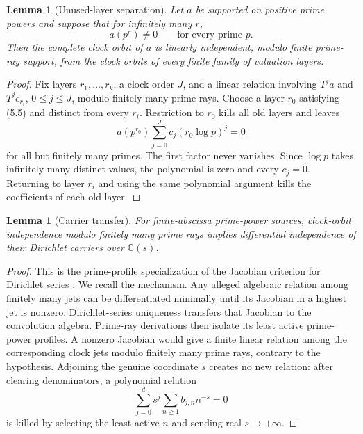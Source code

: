 \documentclass[11pt]{article}
\newtheorem{lemma}[theorem]{Lemma}
\theoremstyle{definition}
\theoremstyle{remark}
\newcommand{\C}{\mathbb C}
\begin{document}
\begin{lemma}[Unused-layer separation]\label{lem:unused}
Let \(a\) be supported on positive prime powers and suppose that for infinitely many \(r\),
\[
 a(p^r)\ne0\qquad\text{for every prime }p.           \tag{5.5}
\]
Then the complete clock orbit of \(a\) is linearly independent, modulo finite prime-ray support,
from the clock orbits of every finite family of valuation layers.
\end{lemma}

\begin{proof}
Fix layers \(r_1,\ldots,r_k\), a clock order \(J\), and a linear relation involving
\(T^ja\) and \(T^je_{r_i}\), \(0\le j\le J\), modulo finitely many prime rays.  Choose a layer
\(r_0\) satisfying (5.5) and distinct from every \(r_i\).  Restriction to \(r_0\) kills all old
layers and leaves
\[
 a(p^{r_0})\sum_{j=0}^J c_j(r_0\log p)^j=0
\]
for all but finitely many primes.  The first factor never vanishes.  Since \(\log p\) takes
infinitely many distinct values, the polynomial is zero and every \(c_j=0\).  Returning to
layer \(r_i\) and using the same polynomial argument kills the coefficients of each old layer.
\end{proof}

\begin{lemma}[Carrier transfer]\label{lem:carrier}
For finite-abscissa prime-power sources, clock-orbit independence modulo finitely many prime rays
implies differential independence of their Dirichlet carriers over \(\C(s)\).
\end{lemma}

\begin{proof}
This is the prime-profile specialization of the Jacobian criterion for Dirichlet series
\cite{ShapiroSparer1986}.  We recall the mechanism.  Any alleged algebraic relation among
finitely many jets can be differentiated minimally until its Jacobian in a highest jet is
nonzero.  Dirichlet-series uniqueness transfers that Jacobian to the convolution algebra.
Prime-ray derivations then isolate its least active prime-power profiles.  A nonzero Jacobian
would give a finite linear relation among the corresponding clock jets modulo finitely many
prime rays, contrary to the hypothesis.  Adjoining the genuine coordinate \(s\) creates no new
relation: after clearing denominators, a polynomial relation
\[
 \sum_{j=0}^d s^j\sum_{n\ge1}b_{j,n}n^{-s}=0
\]
is killed by selecting the least active \(n\) and sending real \(s\to+\infty\).
\end{proof}
\end{document}
